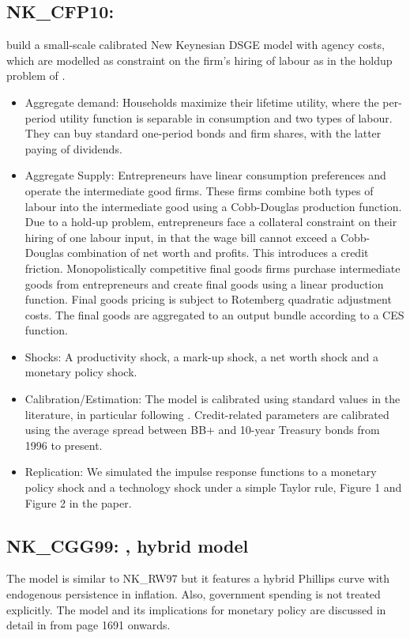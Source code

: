 \documentclass[11pt,a4paper]{article}
\begin{document}
	\subsection{NK\_CFP10: \texorpdfstring{\cite{carlstrom2010optimal}}{Carlstrom et al. (2010)}}
	\label{NKCFP10}
	\cite{carlstrom2010optimal} build a small-scale calibrated New Keynesian DSGE model with agency costs, which are modelled as constraint on the firm's hiring of labour as in the holdup problem of \cite{KiyotakiMoore1999}. 
	\begin{itemize}
		\item Aggregate demand: Households maximize their lifetime utility, where the per-period utility function is separable in consumption and two types of labour. They can buy standard one-period bonds and firm shares, with the latter paying of dividends. 
		\item Aggregate Supply: Entrepreneurs have linear consumption preferences and operate the intermediate good firms. These firms combine both types of labour into the intermediate good using a Cobb-Douglas production function. Due to a hold-up problem, entrepreneurs face a collateral constraint on their hiring of one labour input, in that the wage bill cannot exceed  a Cobb-Douglas combination of net worth and profits. This introduces a credit friction. Monopolistically competitive final goods firms purchase intermediate goods from entrepreneurs and create final goods using a linear production function. Final goods pricing is subject to Rotemberg quadratic adjustment costs. The final goods are aggregated to an output bundle according to a CES function. 
		\item Shocks: A productivity shock, a mark-up shock, a net worth shock and a monetary policy shock. 
		\item Calibration/Estimation: The model is calibrated using standard values in the literature, in particular following \cite{Woodford2003}.  Credit-related parameters are calibrated using the average spread between BB+ and 10-year Treasury bonds from 1996 to present. 
		\item Replication: We simulated the impulse response functions to a monetary policy shock and a technology shock under a simple Taylor rule, Figure 1 and Figure 2 in the paper. 
		
	\end{itemize}
	
	\subsection{NK\_CGG99: \texorpdfstring{\cite{ClaridaGaliGertler1999}}{Clarida et al. (1999)}, hybrid model}
	\label{NKCGG99}
	The model is similar to NK\_RW97 but it features a hybrid
	Phillips curve with endogenous persistence in inflation. Also, government spending is
	not treated explicitly. The
	model and its implications for monetary policy are discussed in
	detail in \cite{ClaridaGaliGertler1999} from page 1691 onwards.
	
\end{document}
